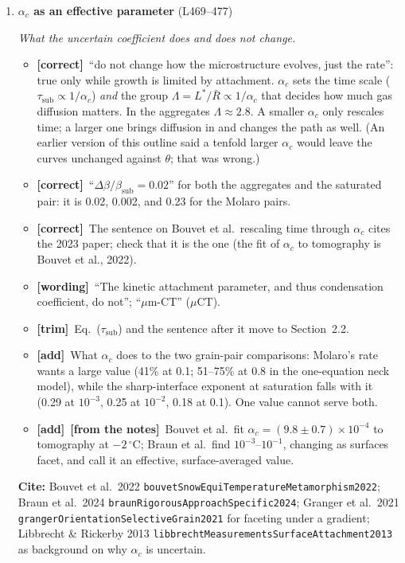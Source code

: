 \documentclass[11pt]{article}
\newcommand{\Note}{\textcolor{open}{\textbf{[from the notes]}}\ }
\newcommand{\Cite}[1]{\par{\footnotesize\raggedright\textcolor{have}{\textbf{Cite:}} #1\par}}
\newcommand{\Pg}[3]{\item \textbf{#1} {\small(#2)}\par\textit{#3}}
\newcommand{\tC}{\textcolor{miss}{\textbf{[correct]}}\ }
\newcommand{\tG}{\textcolor{stale}{\textbf{[wording]}}\ }
\newcommand{\tT}{\textcolor{cut}{\textbf{[trim]}}\ }
\newcommand{\tA}{\textcolor{have}{\textbf{[add]}}\ }
\begin{document}
\begin{enumerate}
\begin{itemize}
    rates, and surface diffusion alone gives $t^{1/7}$, so adding it could
    not raise an exponent toward 1/3.
  \end{itemize}
  \Cite{Demmenie et al.\ 2025 \texttt{demmenieIceSinteringSublimation2025}; Molaro et al.\ 2019 \texttt{molaroMicrostructuralEvolutionWater2019}.}
\Pg{$\alpha_c$ as an effective parameter}{L469--477}{What the uncertain coefficient does and does not change.}
  \begin{itemize}
  \item \tC ``do not change how the microstructure evolves, just the rate'':
    true only while growth is limited by attachment. $\alpha_c$ sets the
    time scale ($\tau_{\mathrm{sub}} \propto 1/\alpha_c$) \emph{and} the
    group $\Lambda = L^{*}/\bar R \propto 1/\alpha_c$ that decides how much
    gas diffusion matters. In the aggregates $\Lambda \approx 2.8$. A
    smaller $\alpha_c$ only rescales time; a larger one brings diffusion
    in and changes the path as well. (An earlier version of this outline
    said a tenfold larger $\alpha_c$ would leave the curves unchanged
    against $\theta$; that was wrong.)
  \item \tC ``$\Delta\beta/\beta_{\mathrm{sub}} = 0.02$'' for both the
    aggregates and the saturated pair: it is 0.02, 0.002, and 0.23 for
    the Molaro pairs.
  \item \tC The sentence on Bouvet et al.\ rescaling time through $\alpha_c$
    cites the 2023 paper; check that it is the one (the fit of $\alpha_c$
    to tomography is Bouvet et al., 2022).
  \item \tG ``The kinetic attachment parameter, and thus condensation
    coefficient, do not''; ``$\mu$m-CT'' ($\mu$CT).
  \item \tT Eq.~($\tau_{\mathrm{sub}}$) and the sentence after it move to
    Section~2.2.
  \item \tA What $\alpha_c$ does to the two grain-pair comparisons: Molaro's
    rate wants a large value (41\% at 0.1; 51--75\% at 0.8 in the
    one-equation neck model), while the sharp-interface exponent at
    saturation falls with it (0.29 at $10^{-3}$, 0.25 at $10^{-2}$, 0.18
    at 0.1). One value cannot serve both.
  \item \tA \Note Bouvet et al.\ fit $\alpha_c = (9.8 \pm 0.7)\times10^{-4}$
    to tomography at $-2\,^{\circ}$C; Braun et al.\ find
    $10^{-3}$--$10^{-1}$, changing as surfaces facet, and call it an
    effective, surface-averaged value.
  \end{itemize}
  \Cite{Bouvet et al.\ 2022 \texttt{bouvetSnowEquiTemperatureMetamorphism2022}; Braun et al.\ 2024 \texttt{braunRigorousApproachSpecific2024}; Granger et al.\ 2021 \texttt{grangerOrientationSelectiveGrain2021} for faceting under a gradient; Libbrecht \& Rickerby 2013 \texttt{libbrechtMeasurements\allowbreak SurfaceAttachment2013} as background on why $\alpha_c$ is uncertain.}
\end{enumerate}
\end{document}
